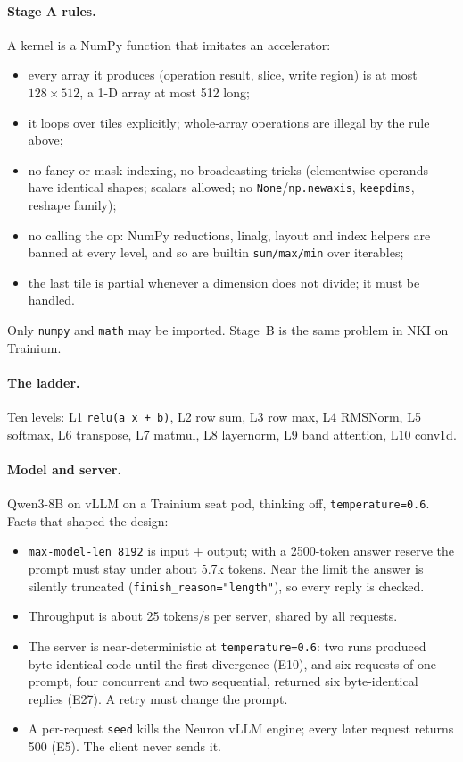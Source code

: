 \documentclass[11pt]{article}
\newcommand{\code}[1]{\texttt{#1}}
\newcommand{\E}[1]{E#1}
\begin{document}
\paragraph{Stage A rules.} A kernel is a NumPy function that imitates an accelerator:
\begin{itemize}
  \item every array it produces (operation result, slice, write region) is at most $128\times512$, a
        1-D array at most 512 long;
  \item it loops over tiles explicitly; whole-array operations are illegal by the rule above;
  \item no fancy or mask indexing, no broadcasting tricks (elementwise operands have identical shapes;
        scalars allowed; no \code{None}/\code{np.newaxis}, \code{keepdims}, reshape family);
  \item no calling the op: NumPy reductions, linalg, layout and index helpers are banned at every
        level, and so are builtin \code{sum/max/min} over iterables;
  \item the last tile is partial whenever a dimension does not divide; it must be handled.
\end{itemize}
Only \code{numpy} and \code{math} may be imported. Stage~B is the same problem in NKI on Trainium.

\paragraph{The ladder.} Ten levels: L1 \code{relu(a x + b)}, L2 row sum, L3 row max, L4 RMSNorm,
L5 softmax, L6 transpose, L7 matmul, L8 layernorm, L9 band attention, L10 conv1d.

\paragraph{Model and server.} Qwen3-8B on vLLM on a Trainium seat pod, thinking off,
\code{temperature=0.6}. Facts that shaped the design:
\begin{itemize}
  \item \code{max-model-len 8192} is input $+$ output; with a 2500-token answer reserve the prompt must
        stay under about 5.7k tokens. Near the limit the answer is silently truncated
        (\code{finish\_reason="length"}), so every reply is checked.
  \item Throughput is about 25 tokens/s per server, shared by all requests.
  \item The server is near-deterministic at \code{temperature=0.6}: two runs produced byte-identical
        code until the first divergence (\E{10}), and six requests of one prompt, four concurrent and two
        sequential, returned six byte-identical replies (\E{27}). A retry must change the prompt.
  \item A per-request \code{seed} kills the Neuron vLLM engine; every later request returns 500 (\E{5}).
        The client never sends it.
\end{itemize}
\end{document}
